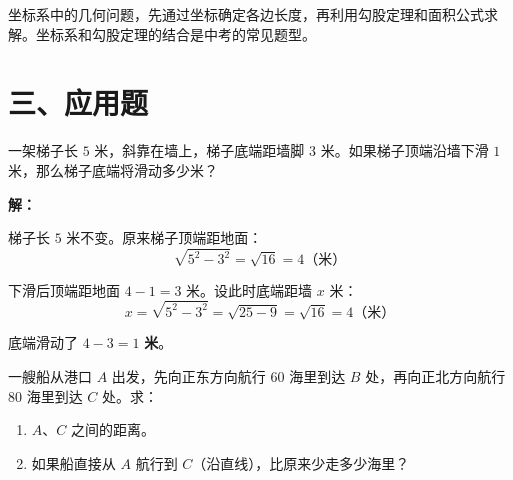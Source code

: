 \documentclass[12pt, a4paper]{ctexart}
\begin{document}
\begin{tipbox}[方法总结]
坐标系中的几何问题，先通过坐标确定各边长度，再利用勾股定理和面积公式求解。坐标系和勾股定理的结合是中考的常见题型。
\end{tipbox}

\section*{\textcolor{apppurple}{三、应用题}}

\begin{appbox}[【应用1】梯子问题]
一架梯子长 $5$ 米，斜靠在墙上，梯子底端距墙脚 $3$ 米。如果梯子顶端沿墙下滑 $1$ 米，那么梯子底端将滑动多少米？

\begin{center}
\end{center}
\end{appbox}

\textbf{解：}

梯子长 $5$ 米不变。原来梯子顶端距地面：
\[
\sqrt{5^2 - 3^2} = \sqrt{16} = 4 \text{（米）}
\]

下滑后顶端距地面 $4 - 1 = 3$ 米。设此时底端距墙 $x$ 米：
\[
x = \sqrt{5^2 - 3^2} = \sqrt{25 - 9} = \sqrt{16} = 4 \text{（米）}
\]

底端滑动了 $4 - 3 = \boxed{1}$ \textbf{米}。

\vspace{6pt}

\begin{appbox}[【应用2】航行问题]
一艘船从港口 $A$ 出发，先向正东方向航行 $60$ 海里到达 $B$ 处，再向正北方向航行 $80$ 海里到达 $C$ 处。求：
\begin{enumerate}[label=(\arabic*)]
  \item $A$、$C$ 之间的距离。
  \item 如果船直接从 $A$ 航行到 $C$（沿直线），比原来少走多少海里？
\end{enumerate}
\end{appbox}
\end{document}
